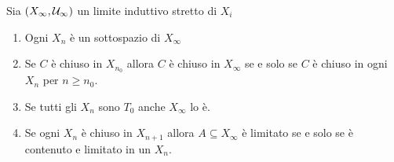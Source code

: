 \begin{proposition}\label{PrProprietaLimitiInduttiviStretti}
Sia $(X_\infty,\mathcal{U}_\infty)$ un limite induttivo stretto di $X_i$
\begin{enumerate}
    \item Ogni $X_n$ \`e un sottospazio di $X_\infty$
    \item Se $C$ \`e chiuso in $X_{n_0}$ allora $C$ \`e chiuso in $X_\infty$ se e solo se $C$ \`e chiuso in ogni $X_n$ per $n\geq n_0$.
    \item Se tutti gli $X_n$ sono $T_0$ anche $X_\infty$ lo \`e.
    \item Se ogni $X_n$ \`e chiuso in $X_{n+1}$ allora $A\subseteq X_\infty$ \`e limitato se e solo se \`e contenuto e limitato in un $X_n$.
\end{enumerate}
\end{proposition}
